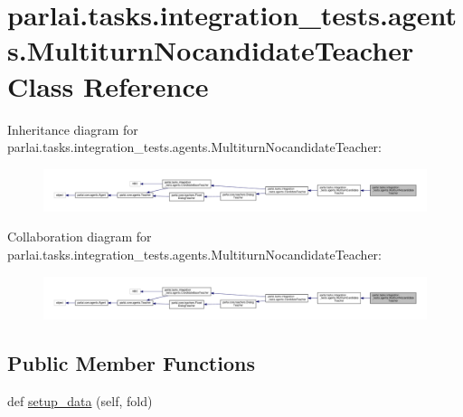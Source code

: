 \hypertarget{classparlai_1_1tasks_1_1integration__tests_1_1agents_1_1MultiturnNocandidateTeacher}{}\section{parlai.\+tasks.\+integration\+\_\+tests.\+agents.\+Multiturn\+Nocandidate\+Teacher Class Reference}
\label{classparlai_1_1tasks_1_1integration__tests_1_1agents_1_1MultiturnNocandidateTeacher}


Inheritance diagram for parlai.\+tasks.\+integration\+\_\+tests.\+agents.\+Multiturn\+Nocandidate\+Teacher\+:
\nopagebreak
\begin{figure}[H]
\begin{center}
\leavevmode
\includegraphics[width=350pt]{da/d08/classparlai_1_1tasks_1_1integration__tests_1_1agents_1_1MultiturnNocandidateTeacher__inherit__graph}
\end{center}
\end{figure}


Collaboration diagram for parlai.\+tasks.\+integration\+\_\+tests.\+agents.\+Multiturn\+Nocandidate\+Teacher\+:
\nopagebreak
\begin{figure}[H]
\begin{center}
\leavevmode
\includegraphics[width=350pt]{da/d88/classparlai_1_1tasks_1_1integration__tests_1_1agents_1_1MultiturnNocandidateTeacher__coll__graph}
\end{center}
\end{figure}
\subsection*{Public Member Functions}
\begin{DoxyCompactItemize}
\item 
def \hyperlink{classparlai_1_1tasks_1_1integration__tests_1_1agents_1_1MultiturnNocandidateTeacher_ac786d0ae36e1d445d68a076b8d1b8391}{setup\+\_\+data} (self, fold)
\end{DoxyCompactItemize}

